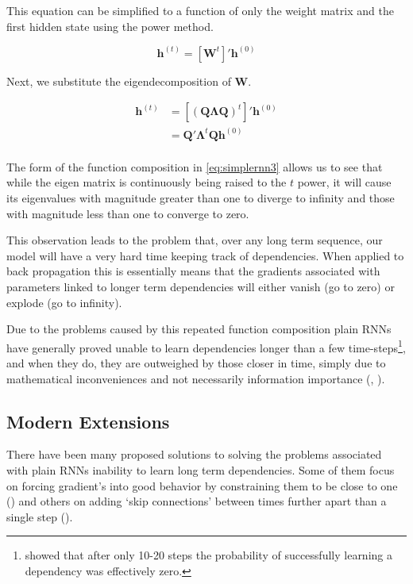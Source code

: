 \documentclass[]{book}
\let\rmarkdownfootnote\footnote%
\def\footnote{\protect\rmarkdownfootnote}
\theoremstyle{definition}
\theoremstyle{definition}
\theoremstyle{definition}
\theoremstyle{remark}
\begin{document}
This equation can be simplified to a function of only the weight matrix
and the first hidden state using the power method.

\begin{equation} 
  \mathbf{h}^{(t)} = \left[\mathbf{W}^t\right]' \mathbf{h}^{(0)}
  \label{eq:simplernn2}
\end{equation}

Next, we substitute the eigendecomposition of \(\mathbf{W}\).

\begin{align} 
  \mathbf{h}^{(t)} &= \left[(\mathbf{Q}\mathbf{\Lambda}\mathbf{Q})^t\right]' \mathbf{h}^{(0)} \\
                    &= \mathbf{Q}'\mathbf{\Lambda}^t \mathbf{Q} \mathbf{h}^{(0)} \\
  \label{eq:simplernn3}
\end{align}

The form of the function composition in \eqref{eq:simplernn3} allows us to
see that while the eigen matrix is continuously being raised to the
\(t\) power, it will cause its eigenvalues with magnitude greater than
one to diverge to infinity and those with magnitude less than one to
converge to zero.

This observation leads to the problem that, over any long term sequence,
our model will have a very hard time keeping track of dependencies. When
applied to back propagation this is essentially means that the gradients
associated with parameters linked to longer term dependencies will
either vanish (go to zero) or explode (go to infinity).

Due to the problems caused by this repeated function composition plain
RNNs have generally proved unable to learn dependencies longer than a
few time-steps\footnote{\citet{bengio_gradient} showed that after only
  10-20 steps the probability of successfully learning a dependency was
  effectively zero.}, and when they do, they are outweighed by those
closer in time, simply due to mathematical inconveniences and not
necessarily information importance (\citet{bengio_gradient},
\citet{graves_rnn}).

\subsection{Modern Extensions}\label{modern-extensions}

There have been many proposed solutions to solving the problems
associated with plain RNNs inability to learn long term dependencies.
Some of them focus on forcing gradient's into good behavior by
constraining them to be close to one (\citet{bounded_gradient_rnn}) and
others on adding `skip connections' between times further apart than a
single step (\citet{skip_connections}).
\end{document}
